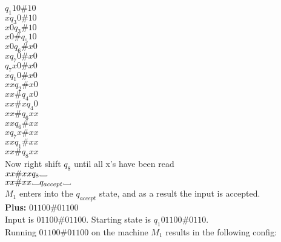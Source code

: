 \documentclass[12pt]{article}
\newcommand\Vtextvisiblespace[1][.8em]{%
	\mbox{\kern.07em\vrule height.3ex}%
	\vbox{\hrule width#1}%
	\hbox{\vrule height.3ex}}
\begin{document}
$            q_1 10 \# 10   $ \\
$x           q_3 0  \# 10   $ \\
$x0          q_3    \# 10   $ \\
$x0 \#       q_5       10   $ \\
$x0          q_6    \# x0   $ \\
$x           q_7  0 \# x0   $ \\
$            q_7 x0 \# x0   $ \\
$x           q_1  0 \# x0   $ \\
$xx          q_2    \# x0   $ \\
$xx \#       q_4       x0   $ \\
$xx \# x     q_4        0   $ \\
$xx \#       q_6       xx   $ \\
$xx          q_6    \# xx   $ \\
$x           q_7  x \# xx   $ \\
$xx          q_1    \# xx   $ \\
$xx \#       q_8       xx   $ \\
Now right shift $q_8$ until all x's have been read \\
$xx \# xx    q_8  \Vtextvisiblespace   $ \\
$xx \# xx         \Vtextvisiblespace q_{accept} \Vtextvisiblespace $ \\
$M_1$ enters into the $q_{accept}$ state, and as a result the input is accepted. \\

\pagebreak
\textbf{Plus:} $01100\#01100$ \\

Input is $01100\#01100$. Starting state is $q_1 01100\#0110$. \\
Running $01100\#01100$ on the machine $M_1$ results in the following config: \\
\end{document}
